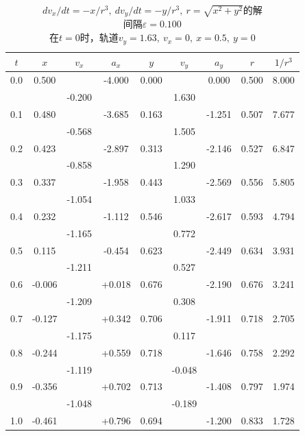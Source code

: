 \begin{longtable}{|c|c|c|c|c|c|c|c|c|}
    \caption{$dv_x/dt=-x/r^3,~dv_y/dt=-y/r^3,~r=\sqrt{x^2+y^2}$的解 \\ 间隔$\varepsilon =0.100$ \\ 在$t=0$时，轨道$v_y=1.63,~v_x=0,~x=0.5,~y=0$} \label{Table:9:2} \\
    \hline
    $t$ & $x$ & $v_x$ & $a_x$ & $y$ & $v_y$ & $a_y$ & $r$ & $1/r^3$ \\ \hline
    0.0 & 0.500 & ~ & -4.000 & 0.000 & ~ & 0.000 & 0.500 & 8.000 \\ 
    ~ & ~ & -0.200 & ~ & ~ & 1.630 & ~ & ~ & ~ \\ 
    0.1 & 0.480 & ~ & -3.685 & 0.163 & ~ & -1.251 & 0.507 & 7.677 \\ 
    ~ & ~ & -0.568 & ~ & ~ & 1.505 & ~ & ~ & ~ \\ 
    0.2 & 0.423 & ~ & -2.897 & 0.313 & ~ & -2.146 & 0.527 & 6.847 \\ 
    ~ & ~ & -0.858 & ~ & ~ & 1.290 & ~ & ~ & ~ \\ 
    0.3 & 0.337 & ~ & -1.958 & 0.443 & ~ & -2.569 & 0.556 & 5.805 \\ 
    ~ & ~ & -1.054 & ~ & ~ & 1.033 & ~ & ~ & ~ \\ 
    0.4 & 0.232 & ~ & -1.112 & 0.546 & ~ & -2.617 & 0.593 & 4.794 \\ 
    ~ & ~ & -1.165 & ~ & ~ & 0.772 & ~ & ~ & ~ \\ 
    0.5 & 0.115 & ~ & -0.454 & 0.623 & ~ & -2.449 & 0.634 & 3.931 \\ 
    ~ & ~ & -1.211 & ~ & ~ & 0.527 & ~ & ~ & ~ \\ 
    0.6 & -0.006 & ~ & +0.018 & 0.676 & ~ & -2.190 & 0.676 & 3.241 \\ 
    ~ & ~ & -1.209 & ~ & ~ & 0.308 & ~ & ~ & ~ \\ 
    0.7 & -0.127 & ~ & +0.342 & 0.706 & ~ & -1.911 & 0.718 & 2.705 \\ 
    ~ & ~ & -1.175 & ~ & ~ & 0.117 & ~ & ~ & ~ \\ 
    0.8 & -0.244 & ~ & +0.559 & 0.718 & ~ & -1.646 & 0.758 & 2.292 \\ 
    ~ & ~ & -1.119 & ~ & ~ & -0.048 & ~ & ~ & ~ \\ 
    0.9 & -0.356 & ~ & +0.702 & 0.713 & ~ & -1.408 & 0.797 & 1.974 \\ 
    ~ & ~ & -1.048 & ~ & ~ & -0.189 & ~ & ~ & ~ \\ 
    1.0 & -0.461 & ~ & +0.796 & 0.694 & ~ & -1.200 & 0.833 & 1.728 \\ 

\end{longtable}
